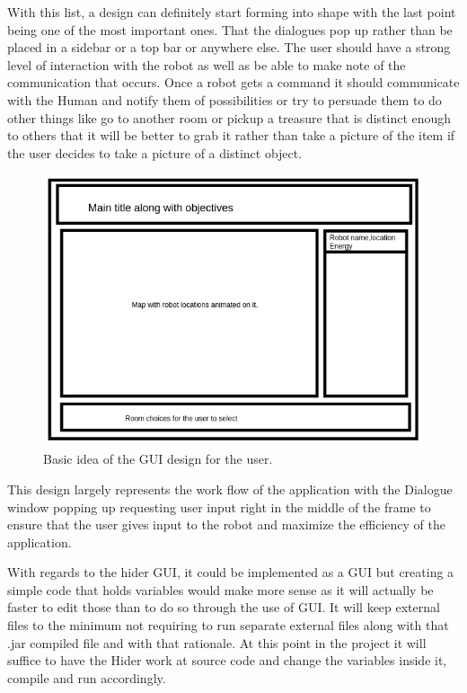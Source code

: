         With this list, a design can definitely start forming into shape with the last point being one of the most important ones. That the dialogues pop up rather than be placed in a sidebar or a top bar or anywhere else. The user should have a strong level of interaction with the robot as well as be able to make note of the communication that occurs. Once a robot gets a command it should communicate with the Human and notify them of possibilities or try to persuade them to do other things like go to another room or pickup a treasure that is distinct enough to others that it will be better to grab it rather than take a picture of the item if the user decides to take a picture of a distinct object.

          \begin{figure}[!ht]  
            \centering
              \includegraphics[width=1\textwidth]{figures/GUIDesign.png}
              \caption{Basic idea of the GUI design for the user.}
          \end{figure}

        This design largely represents the work flow of the application with the Dialogue window popping up requesting user input right in the middle of the frame to ensure that the user gives input to the robot and maximize the efficiency of the application.

        With regards to the hider GUI, it could be implemented as a GUI but creating a simple code that holds variables would make more sense as it will actually be faster to edit those than to do so through the use of GUI. It will keep external files to the minimum not requiring to run separate external files along with that .jar compiled file and with that rationale. At this point in the project it will suffice to have the Hider work at source code and change the variables inside it, compile and run accordingly.

